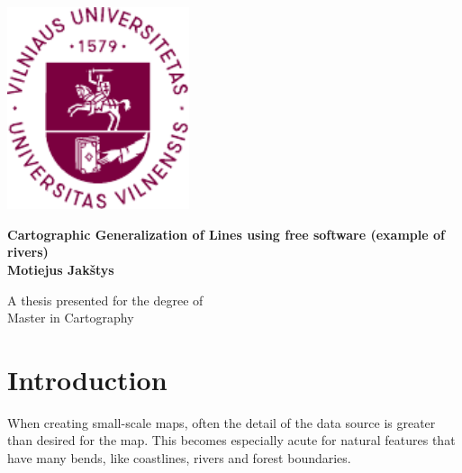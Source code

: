 \documentclass[a4paper]{article}
\title{\MYTITLE}
\author{\MYAUTHOR}
\date{\VCDescribe}
\newcommand{\WM}{Wang--M{\"u}ller}
\newcommand{\MYTITLE}{Cartographic Generalization of Lines using free software (example of rivers)}
\newcommand{\MYAUTHOR}{Motiejus Jakštys}
\begin{document}
\begin{titlepage}
    \begin{center}
        \includegraphics[width=0.4\textwidth]{vu}

        \huge
        \textbf{\MYTITLE} \\[4ex]

        \LARGE
        \textbf{\MYAUTHOR} \\[8ex]

        \vfill

        A thesis presented for the degree of\\
        Master in Cartography \\[3ex]

        \large
        \VCDescribe
    \end{center}
\end{titlepage}

\begin{abstract}
\label{sec:abstract}
Current open-source line generalization solutions have their roots in
    mathematics and geometry, and are not fit for natural objects like rivers
    and coastlines. This paper discusses our implementation of {\WM} algorithm
    under and open-source license, explains things that we would had
    appreciated in the original paper and compares our results to different
    generalization algorithms.
\end{abstract}

\newpage

\tableofcontents
\listoffigures

\newpage

\section{Introduction}
\label{sec:introduction}

When creating small-scale maps, often the detail of the data source is greater
than desired for the map. This becomes especially acute for natural features
that have many bends, like coastlines, rivers and forest boundaries.
\end{document}
